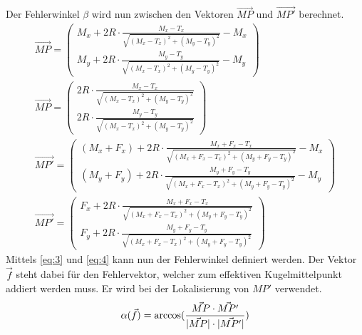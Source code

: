 Der Fehlerwinkel $\beta$ wird nun zwischen den Vektoren $\vec{MP}$ und $\vec{MP'}$ berechnet.
\begin{align}
    \vec{MP} = \begin{pmatrix}M_x + 2R \cdot \frac{M_x - T_x}{\sqrt{(M_x - T_x)^2 + (M_y - T_y)^2}} - M_x\\M_y + 2R \cdot \frac{M_y - T_y}{\sqrt{(M_x - T_x)^2 + (M_y - T_y)^2}} - M_y\end{pmatrix}\\
    \vec{MP} = \begin{pmatrix}2R \cdot \frac{M_x - T_x}{\sqrt{(M_x - T_x)^2 + (M_y - T_y)^2}}\\2R \cdot \frac{M_y - T_y}{\sqrt{(M_x - T_x)^2 + (M_y - T_y)^2}}\end{pmatrix}\label{eq:3}\\
    \vec{MP'} = \begin{pmatrix}(M_x + F_x) + 2R \cdot \frac{M_x + F_x - T_x}{\sqrt{(M_x + F_x - T_x)^2 + (M_y + F_y - T_y)^2}} - M_x\\(M_y + F_y) + 2R \cdot \frac{M_y + F_y - T_y}{\sqrt{(M_x + F_x - T_x)^2 + (M_y + F_y - T_y)^2}} - M_y\end{pmatrix}\\
    \vec{MP'} = \begin{pmatrix}F_x + 2R \cdot \frac{M_x + F_x - T_x}{\sqrt{(M_x + F_x - T_x)^2 + (M_y + F_y - T_y)^2}}\\F_y + 2R \cdot \frac{M_y + F_y - T_y}{\sqrt{(M_x + F_x - T_x)^2 + (M_y + F_y - T_y)^2}}\end{pmatrix}\label{eq:4}
\end{align}
Mittels \ref{eq:3} und \ref{eq:4} kann nun der Fehlerwinkel definiert werden. Der Vektor $\vec{f}$ steht
dabei für den Fehlervektor, welcher zum effektiven Kugelmittelpunkt addiert werden muss. Er wird bei der Lokalisierung von $MP'$
verwendet.
\begin{align}
    \alpha(\vec{f}) = \arccos(\frac{\vec{MP} \cdot \vec{MP'}}{\lvert \vec{MP} \rvert \cdot \lvert \vec{MP'} \rvert})
\end{align}

